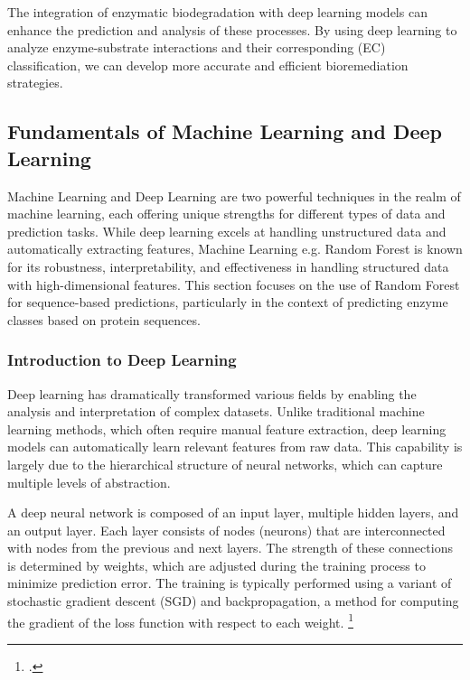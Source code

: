 The integration of enzymatic biodegradation with deep learning models can enhance the prediction and analysis of these processes. By using deep learning to analyze enzyme-substrate interactions and their corresponding (EC) classification, we can develop more accurate and efficient bioremediation strategies.

\subsection{Fundamentals of Machine Learning and Deep Learning}
\label{sec:Fundamentals of Deep Learning}

Machine Learning and Deep Learning are two powerful techniques in the realm of machine learning, each offering unique strengths for different types of data and prediction tasks. While deep learning excels at handling unstructured data and automatically extracting features, Machine Learning e.g. Random Forest is known for its robustness, interpretability, and effectiveness in handling structured data with high-dimensional features. This section focuses on the use of Random Forest for sequence-based predictions, particularly in the context of predicting enzyme classes based on protein sequences.

\subsubsection{Introduction to Deep Learning}
\label{sec:Introduction to Deep Learning}

Deep learning has dramatically transformed various fields by enabling the analysis and interpretation of complex datasets. Unlike traditional machine learning methods, which often require manual feature extraction, deep learning models can automatically learn relevant features from raw data. This capability is largely due to the hierarchical structure of neural networks, which can capture multiple levels of abstraction.

A deep neural network is composed of an input layer, multiple hidden layers, and an output layer. Each layer consists of nodes (neurons) that are interconnected with nodes from the previous and next layers. The strength of these connections is determined by weights, which are adjusted during the training process to minimize prediction error. The training is typically performed using a variant of stochastic gradient descent (SGD) and backpropagation, a method for computing the gradient of the loss function with respect to each weight. \footcite{bishopPatternRecognitionMachine2006}

